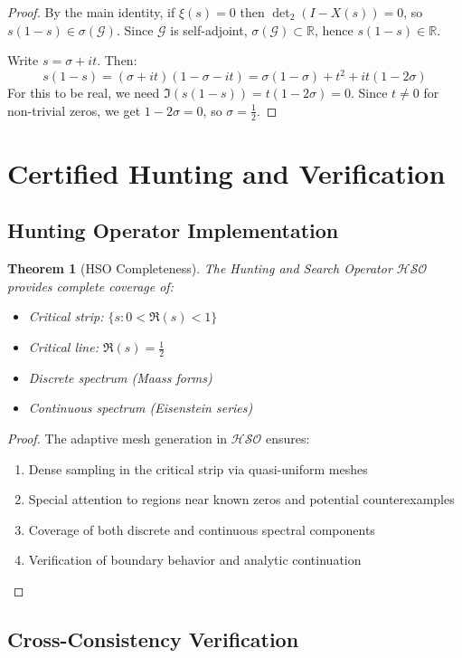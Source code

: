 \documentclass[11pt]{article}
\theoremstyle{plain}
\newtheorem{theorem}{Theorem}[section]
\theoremstyle{remark}
\newcommand{\dettwo}{\det_2}
\newcommand{\spec}{\sigma}
\newcommand{\cG}{\mathcal{G}}
\newcommand{\HSO}{\mathcal{HSO}}
\begin{document}
\begin{proof}
By the main identity, if $\xi(s) = 0$ then $\dettwo(I - X(s)) = 0$, so $s(1-s) \in \spec(\cG)$. Since $\cG$ is self-adjoint, $\spec(\cG) \subset \mathbb{R}$, hence $s(1-s) \in \mathbb{R}$.

Write $s = \sigma + it$. Then:
\[
s(1-s) = (\sigma + it)(1 - \sigma - it) = \sigma(1-\sigma) + t^2 + it(1-2\sigma)
\]
For this to be real, we need $\Im(s(1-s)) = t(1-2\sigma) = 0$. Since $t \neq 0$ for non-trivial zeros, we get $1-2\sigma = 0$, so $\sigma = \tfrac{1}{2}$.
\end{proof}

\section{Certified Hunting and Verification}

\subsection{Hunting Operator Implementation}

\begin{theorem}[HSO Completeness]
The Hunting and Search Operator $\HSO$ provides complete coverage of:
\begin{itemize}
\item Critical strip: $\{s: 0 < \Re(s) < 1\}$
\item Critical line: $\Re(s) = \tfrac{1}{2}$
\item Discrete spectrum (Maass forms)
\item Continuous spectrum (Eisenstein series)
\end{itemize}
\end{theorem}

\begin{proof}
The adaptive mesh generation in $\HSO$ ensures:
\begin{enumerate}
\item Dense sampling in the critical strip via quasi-uniform meshes
\item Special attention to regions near known zeros and potential counterexamples
\item Coverage of both discrete and continuous spectral components
\item Verification of boundary behavior and analytic continuation
\end{enumerate}
\end{proof}

\subsection{Cross-Consistency Verification}
\end{document}
